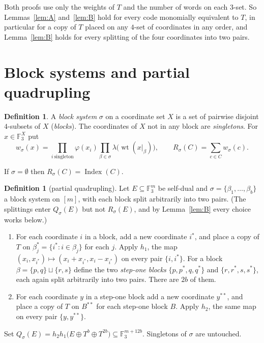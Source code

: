 \documentclass[11pt]{amsart}
\theoremstyle{definition}
\newtheorem{definition}[theorem]{Definition}
\newcommand{\F}{\mathbb{F}_3}
\newcommand{\wt}{\operatorname{wt}}
\newcommand{\Index}{\operatorname{Index}}
\begin{document}
Both proofs use only the weights of $T$ and the number of words on each $3$-set. So Lemmas~\ref{lem:A}
and~\ref{lem:B} hold for every code monomially equivalent to $T$, in particular for a copy of $T$
placed on any $4$-set of coordinates in any order, and Lemma~\ref{lem:B} holds for every splitting of
the four coordinates into two pairs.

\section{Block systems and partial quadrupling}

\begin{definition}\label{def:R}
A \emph{block system} $\sigma$ on a coordinate set $X$ is a set of pairwise disjoint $4$-subsets
of $X$ (\emph{blocks}). The coordinates of $X$ not in any block are \emph{singletons}. For
$x\in\F^X$ put
\[
  w_\sigma(x)=\prod_{i\ \text{singleton}}\varphi(x_i)\prod_{\beta\in\sigma}\lambda\bigl(\wt(x|_\beta)\bigr),
  \qquad R_\sigma(C)=\sum_{c\in C}w_\sigma(c).
\]
\end{definition}

If $\sigma=\emptyset$ then $R_\sigma(C)=\Index(C)$.

\begin{definition}[partial quadrupling]\label{def:Q}
Let $E\subseteq\F^m$ be self-dual and $\sigma=\{\beta_1,\dots,\beta_b\}$ a block system on $[m]$,
with each block split arbitrarily into two pairs. (The splittings enter $Q_\sigma(E)$ but not
$R_\sigma(E)$, and by Lemma~\ref{lem:B} every choice works below.)
\begin{enumerate}
\item[(1)] For each coordinate $i$ in a block, add a new coordinate $i^*$, and place a copy of $T$ on
$\beta_j^*=\{i^*:i\in\beta_j\}$ for each $j$. Apply $h_1$, the map $(x_i,x_{i^*})\mapsto(x_i+x_{i^*},x_i-x_{i^*})$ on
every pair $\{i,i^*\}$. For a block $\beta=\{p,q\}\sqcup\{r,s\}$ define the two \emph{step-one blocks}
$\{p,p^*,q,q^*\}$ and $\{r,r^*,s,s^*\}$, each again split arbitrarily into two pairs. There are $2b$ of them.
\item[(2)] For each coordinate $y$ in a step-one block add a new coordinate $y^{**}$, and place a copy of $T$ on
$B^{**}$ for each step-one block $B$. Apply $h_2$, the same map on every pair $\{y,y^{**}\}$.
\end{enumerate}
Set $Q_\sigma(E)=h_2h_1\bigl(E\oplus T^{b}\oplus T^{2b}\bigr)\subseteq\F^{m+12b}$. Singletons of $\sigma$ are untouched.
\end{definition}
\end{document}
